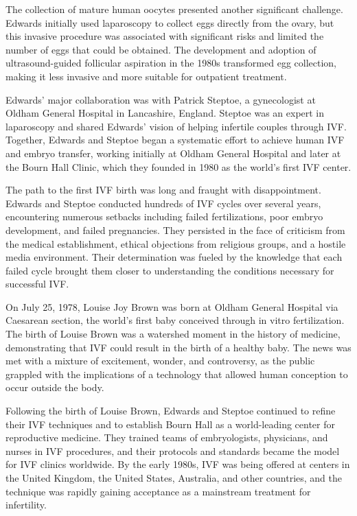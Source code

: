 The collection of mature human oocytes presented another significant challenge. Edwards initially used laparoscopy to collect eggs directly from the ovary, but this invasive procedure was associated with significant risks and limited the number of eggs that could be obtained. The development and adoption of ultrasound-guided follicular aspiration in the 1980s transformed egg collection, making it less invasive and more suitable for outpatient treatment.

Edwards' major collaboration was with Patrick Steptoe, a gynecologist at Oldham General Hospital in Lancashire, England. Steptoe was an expert in laparoscopy and shared Edwards' vision of helping infertile couples through IVF. Together, Edwards and Steptoe began a systematic effort to achieve human IVF and embryo transfer, working initially at Oldham General Hospital and later at the Bourn Hall Clinic, which they founded in 1980 as the world's first IVF center.

The path to the first IVF birth was long and fraught with disappointment. Edwards and Steptoe conducted hundreds of IVF cycles over several years, encountering numerous setbacks including failed fertilizations, poor embryo development, and failed pregnancies. They persisted in the face of criticism from the medical establishment, ethical objections from religious groups, and a hostile media environment. Their determination was fueled by the knowledge that each failed cycle brought them closer to understanding the conditions necessary for successful IVF.

On July 25, 1978, Louise Joy Brown was born at Oldham General Hospital via Caesarean section, the world's first baby conceived through in vitro fertilization. The birth of Louise Brown was a watershed moment in the history of medicine, demonstrating that IVF could result in the birth of a healthy baby. The news was met with a mixture of excitement, wonder, and controversy, as the public grappled with the implications of a technology that allowed human conception to occur outside the body.

Following the birth of Louise Brown, Edwards and Steptoe continued to refine their IVF techniques and to establish Bourn Hall as a world-leading center for reproductive medicine. They trained teams of embryologists, physicians, and nurses in IVF procedures, and their protocols and standards became the model for IVF clinics worldwide. By the early 1980s, IVF was being offered at centers in the United Kingdom, the United States, Australia, and other countries, and the technique was rapidly gaining acceptance as a mainstream treatment for infertility.

